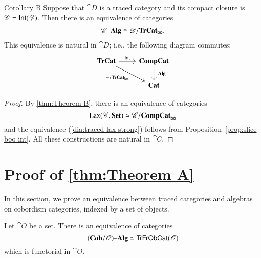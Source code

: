\documentclass[12pt,oneside,article,draft]{memoir}
\begin{document}
 \begin{named}{Corollary B}\label{cor:Corollary B}
Suppose that $\cat{D}$ is a traced category and its compact closure is $\mathscr{C}=\mathsf{Int}(\mathscr{D})$. Then there is an equivalence of categories
\begin{align}\label{dia:traced lax strong}
\mathscr{C}{\text \textendash}\mathbf{Alg}\cong\mathscr{D}/\mathbf{TrCat}_{\mathsf{bo}}.
\end{align}
This equivalence is natural in $\cat{D}$; i.e., the following diagram commutes:
\begin{equation*}
\begin{tikzcd}
\TrCat\ar[r,"\Fun{Int}"]\ar[dr,"-/\TrCat_{\bo}"']&\CompCat\ar[d,"\alg"]\\
&\Cat{Cat}
\end{tikzcd}
\end{equation*}
\end{named}

\begin{proof}

By \ref{thm:Theorem B}, there is an equivalence of categories 
$$\operatorname{Lax}(\mathscr{C},\mathbf{Set})\simeq\mathscr{C}/\mathbf{CompCat}_{\mathsf{bo}}$$
and the equivalence (\ref{dia:traced lax strong}) follows from Proposition~\ref{prop:slice boo int}. All these constructions are natural in $\cat{C}$. 

\end{proof}

\section{Proof of \ref{thm:Theorem A}}\label{sec:proof of A}

In this section, we prove an equivalence between traced categories and algebras on cobordism categories, indexed by a set of objects. 

\begin{proposition}\label{prop:natural equivalence cob-O and traced-O}

Let $\cat{O}$ be a set. There is an equivalence of categories 
$$(\mathbf{Cob}/\mathscr{O}){\text \textendash}\mathbf{Alg}\simeq\mathsf{TrFrObCat}(\mathscr{O})$$
which is functorial in $\cat{O}$.

\end{proposition}
\end{document}
